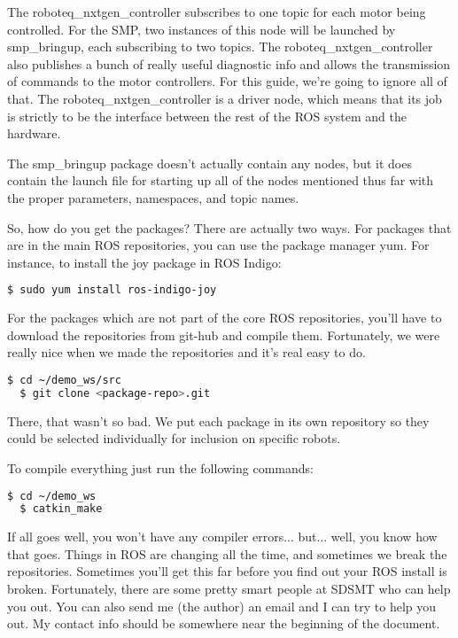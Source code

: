 The roboteq\_nxtgen\_controller subscribes to one topic for each motor being controlled. For the SMP, two instances of this node will be launched by smp\_bringup, each subscribing to two topics. The roboteq\_nxtgen\_controller also publishes a bunch of really useful diagnostic info and allows the transmission of commands to the motor controllers. For this guide, we're going to ignore all of that. The roboteq\_nxtgen\_controller is a driver node, which means that its job is strictly to be the interface between the rest of the ROS system and the hardware.

The smp\_bringup package doesn't actually contain any nodes, but it does contain the launch file for starting up all of the nodes mentioned thus far with the proper parameters, namespaces, and topic names.

So, how do you get the packages? There are actually two ways. For packages that are in the main ROS repositories, you can use the package manager yum. For instance, to install the joy package in ROS Indigo:

\begin{lstlisting}[language=bash]
  $ sudo yum install ros-indigo-joy
\end{lstlisting}

For the packages which are not part of the core ROS repositories, you'll have to download the repositories from git-hub and compile them. Fortunately, we were really nice when we made the repositories and it's real easy to do.

\begin{lstlisting}[language=bash]
  $ cd ~/demo_ws/src
  $ git clone <package-repo>.git
\end{lstlisting}

There, that wasn't so bad. We put each package in its own repository so they could be selected individually for inclusion on specific robots.

To compile everything just run the following commands:

\begin{lstlisting}[language=bash]
  $ cd ~/demo_ws
  $ catkin_make
\end{lstlisting}

If all goes well, you won't have any compiler errors... but... well, you know how that goes. Things in ROS are changing all the time, and sometimes we break the repositories. Sometimes you'll get this far before you find out your ROS install is broken. Fortunately, there are some pretty smart people at SDSMT who can help you out. You can also send me (the author) an email and I can try to help you out. My contact info should be somewhere near the beginning of the document.

